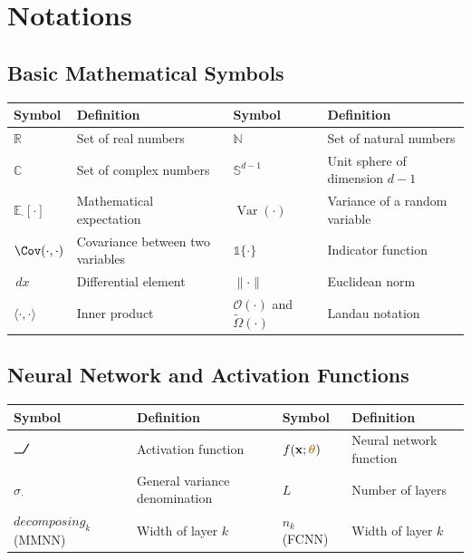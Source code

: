 \documentclass[a4paper]{article}
\DeclareRobustCommand{\ReLU}{\mathrel{\text{%
    \begin{tikzpicture}[baseline=(current bounding box.south)]
        \draw[thick] (0,0) -- (0.25,0) -- (0.4,0.25);
    \end{tikzpicture}}}\!\!}
\newcommand{\E}{\mathbb{E}}
\DeclareMathOperator{\Var}{Var}
\newcommand{\indic}{\mathbb{1}}
\newcommand{\dd}{\,d}
\theoremstyle{plain}
\theoremstyle{definition}
\theoremstyle{remark}
\begin{document}
\newpage








\section*{Notations}

\begin{tcolorbox}[colback=blue!5,colframe=blue!50!black,title={\large \textbf{Mathematical Notation Reference}},enhanced,drop shadow]

\subsection*{Basic Mathematical Symbols}
\begin{longtable}{p{}p{}p{}p{}}
\toprule
\textbf{Symbol} & \textbf{Definition} & \textbf{Symbol} & \textbf{Definition} \\
\midrule
$\mathbb{R}$ & Set of real numbers & $\mathbb{N}$ & Set of natural numbers \\
$\mathbb{C}$ & Set of complex numbers & $\mathbb{S}^{d-1}$ & Unit sphere of dimension $d-1$ \\
$\E_{\cdot}[\cdot]$ & Mathematical expectation & $\Var(\cdot)$ & Variance of a random variable \\
$\Cov(\cdot,\cdot)$ & Covariance between two variables & $\indic\{\cdot\}$ & Indicator function \\
$\dd x$ & Differential element & $\|\cdot\|$ & Euclidean norm \\
$\langle \cdot,\cdot \rangle$ & Inner product & $\mathcal{O}(\cdot)$ and $\tilde{\Omega}(\cdot)$  & Landau notation \\
\bottomrule
\end{longtable}

\subsection*{Neural Network and Activation Functions}
\begin{longtable}{p{}p{}p{}p{}}
\toprule
\textbf{Symbol} & \textbf{Definition} & \textbf{Symbol} & \textbf{Definition} \\
\midrule
$\ReLU$ & Activation function & $f(\mathbf{x}; \boldsymbol{\textcolor{darkyellow}{\theta}})$ & Neural network function \\
$\sigma_{\cdot}$ & General variance denomination & $L$ & Number of layers \\
$decomposing_k$ (MMNN) & Width of layer $k$ & $n_k$ (FCNN) & Width of layer $k$ \\
\bottomrule
\end{longtable}


\end{tcolorbox}
\end{document}

